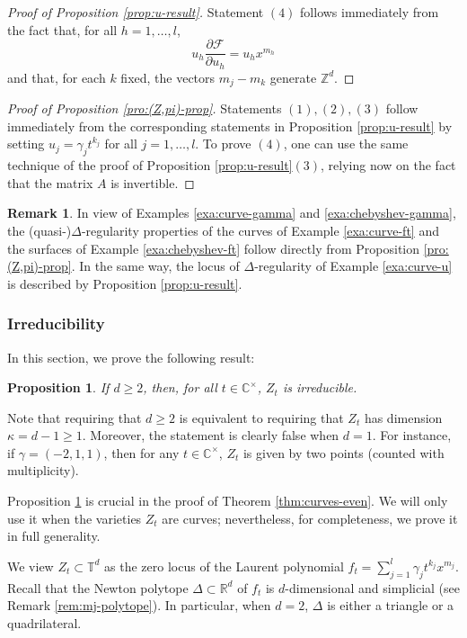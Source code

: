 \documentclass[11pt, reqno]{amsart}
\theoremstyle{plain}
\newtheorem{prop}[thm]{Proposition}
\theoremstyle{definition}
\newtheorem{rem}[thm]{Remark}
\newcommand{\CC}{\mathbb{C}}
\newcommand{\ZZ}{\mathbb{Z}}
\newcommand{\RR}{\mathbb{R}}
\newcommand{\TT}{\mathbb{T}}
\newcommand{\ga}{\gamma}
\begin{document}
\begin{proof}[Proof of Proposition \ref{prop:u-result}]
Statement $(4)$ follows immediately from the fact that, for all $h=1, \dots, l$,
\[u_h \frac{\partial \mathcal{F}} {\partial u_h}= u_h x^{m_h}\]
and that, for each $k$ fixed, the vectors $m_j-m_k$ generate $\ZZ^d$.

\end{proof}


\begin{proof}[Proof of Proposition \ref{pro:(Z,pi)-prop}]
Statements $(1), (2), (3)$ follow immediately from the corresponding statements in Proposition \ref{prop:u-result} by setting $u_j=\gamma_j t^{k_j}$ for all $j=1, \dots, l$. 
To prove $(4)$, one can use the same technique of the proof of Proposition \ref{prop:u-result}$(3)$, relying now on the fact that the matrix ${A}$ is invertible.
\end{proof}

\begin{rem}
In view of Examples \ref{exa:curve-gamma} and \ref{exa:chebyshev-gamma}, the (quasi-)$\Delta$-regularity properties of the curves of Example \ref{exa:curve-ft} and the surfaces of Example \ref{exa:chebyshev-ft} follow directly from Proposition \ref{pro:(Z,pi)-prop}. In the same way, the locus of $\Delta$-regularity of Example \ref{exa:curve-u} is described by
Proposition \ref{prop:u-result}. 
\end{rem}

\subsubsection{Irreducibility}
In this section, we prove the following result:

\begin{prop}\label{prop:irreduciblity}
   If $d \geq 2$, then, for all $t \in \CC^\times$, $Z_t$ is irreducible.
\end{prop}
Note that requiring that $d\geq 2$ is equivalent to requiring that $Z_t$ has dimension $\kappa=d-1 \geq 1$. Moreover, the statement is clearly false when $d=1$. For instance, if $\ga=(-2,1,1)$, then for any $t \in \CC^\times$, $Z_t$ is given by two points (counted with multiplicity).

Proposition \ref{prop:irreduciblity} is crucial in the proof of Theorem \ref{thm:curves-even}. We will only use it when the varieties $Z_t$ are curves; nevertheless, for completeness, we prove it in full generality. 


We view $Z_t \subset \TT^d$ as the zero locus of the Laurent polynomial $f_t=\sum_{j=1}^l \gamma_j t^{k_j}x^{m_j}$. Recall that the Newton polytope $\Delta \subset \RR^d$ of $f_t$ is $d$-dimensional and simplicial (see Remark \ref{rem:mj-polytope}). In particular, when $d=2$, $\Delta$ is either a triangle or a quadrilateral.
\smallskip
\end{document}
